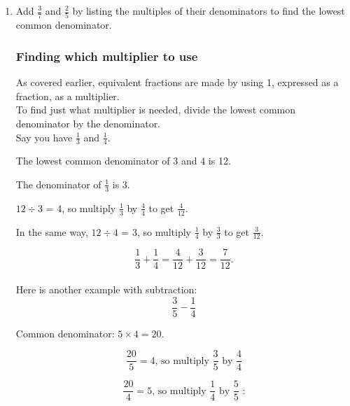 \documentclass[14pt]{article}
\begin{document}
\begin{enumerate}
Multiples of 5: 5, 10, 15, \textcircled{20}, 25

The lowest common multiple is 12, so:
$$\frac{1}{4} + \frac{1}{5}
= (\frac{1}{4} \times \frac{5}{5})
+ (\frac{1}{5} \times \frac{4}{4})
= \frac{5}{20}+\frac{4}{20}
= \frac{9}{20}.$$

\subsubsection*{List the multiples of the denominators}
A thorough way to find common denominators is to list out the multiples of each denominator and pick the lowest number that is common to both lists.

\item Add $\frac{3}{7}$ and $\frac{2}{5}$ by listing the multiples of their denominators to find the lowest common denominator.

\subsubsection*{Finding which multiplier to use}
As covered earlier, equivalent fractions are made by using 1, expressed as a fraction, as a multiplier.\\

To find just what multiplier is needed, divide the lowest common denominator by the denominator.\\

Say you have $\frac{1}{3}$ and $\frac{1}{4}$.

The lowest common denominator of 3 and 4 is 12.

The denominator of $\frac{1}{3}$ is 3.

$12 \div 3$ = 4, so multiply $\frac{1}{3}$ by $\frac{4}{4}$ to get $\frac{4}{12}$.

In the same way, $12 \div 4$ = 3, so multiply $\frac{1}{4}$ by $\frac{3}{3}$ to get $\frac{3}{12}$.

$$\frac{1}{3} + \frac{1}{4} = \frac{4}{12} + \frac{3}{12} = \frac{7}{12}.$$\\

Here is another example with subtraction:
$$\frac{3}{5} - \frac{1}{4}$$

Common denominator: $5 \times 4 = 20$.

$$\frac{20}{5} = 4\text{, so multiply }\frac{3}{5} \text{ by }\frac{4}{4}$$

$$\frac{20}{4} = 5\text{, so multiply }\frac{1}{4}\text{ by }\frac{5}{5}\text{ :}$$


\end{enumerate}
\end{document}

